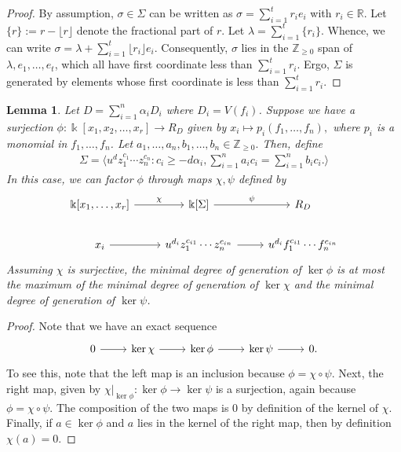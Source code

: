 \documentclass{amsart}
\theoremstyle{plain}
\newtheorem{lem}[thm]{Lemma}
\theoremstyle{definition}
\theoremstyle{remark}
\numberwithin{equation}{section}
\newcommand\br{{\mathbb R}}
\newcommand\bz{{\mathbb Z}}
\newcommand\bk{{\Bbbk}}
\newcommand\bida{a}
\newcommand\bidb{b}
\begin{document}
\begin{proof}
By assumption, $\sigma \in \Sigma$ can be written as $\sigma = \sum_{i=1}^{t} r_i e_i$ with $r_i \in \br$. Let $\{r\} := r - \lfloor r \rfloor$ denote the fractional part of $r$. Let $\lambda = \sum_{i=1}^{t}\{r_i\}$. Whence, we can write $\sigma = \lambda + \sum_{i=1}^{t}\lfloor r_i \rfloor e_i.$ Consequently, $\sigma$ lies in the $\bz_{\geq 0}$ span of $\lambda, e_1,\ldots, e_t$, which all have first coordinate less than $\sum_{i=1}^{t}r_i$. Ergo, $\Sigma$ is generated by elements whose first coordinate is less than $\sum_{i=1}^{t}r_i$.
\end{proof}


\begin{lem}
\label{lem:composite-map}
Let $D = \sum_{i=1}^{n}\alpha_i D_i$ where $D_i = V(f_i)$. Suppose we have a surjection $\phi: \bk[x_1,x_2,\ldots, x_r] \rightarrow R_D$ given by $x_i \mapsto p_i(f_1, \ldots, f_n),$ where $p_i$ is a monomial in $f_1,\ldots, f_n$. Let $\bida_1, \ldots, \bida_n, \bidb_1, \ldots, \bidb_n \in \bz_{\geq 0}.$ Then, define
\begin{align*}
	\Sigma = \langle u^d z_1^{c_1} \cdots z_n^{c_n} : c_i \geq -d \alpha_i, \sum_{i=1}^{n} \bida_i c_i = \sum_{i=1}^{n} \bidb_i c_i. \rangle 
\end{align*}
In this case, we can factor $\phi$ through maps $\chi, \psi$ defined by
\[
\begin{tikzcd}
\bk[x_1,\ldots, x_r] \ar {r}{\chi} & \bk[\Sigma] \ar {r}{\psi} & R_D \\
x_i \ar r & u^{d_i}z_1^{c_{i1}} \cdots z_n^{c_{in}} \ar r & u^{d_i}f_1^{c_{i1}} \cdots f_n^{c_{in}}
\end{tikzcd}
\]
Assuming $\chi$ is surjective, the minimal degree of generation of $\ker \phi$ is at most the maximum of the minimal degree of generation of $\ker \chi$ and the minimal degree of generation of $\ker \psi$.
\end{lem}
\begin{proof}
Note that we have an exact sequence
\[
\begin{tikzcd}
0 \ar r & \ker \chi \ar r & \ker \phi \ar r & \ker \psi \ar r & 0.
\end{tikzcd}
\]
To see this, note that the left map is an inclusion because $\phi = \chi \circ \psi$. Next, the right map, given by $\chi|_{\ker \phi}:\ker \phi \rightarrow \ker \psi$ is a surjection, again because $\phi = \chi \circ \psi$. The composition of the two maps is $0$ by definition of the kernel of $\chi$. Finally, if $a \in \ker \phi$ and $a$ lies in the kernel of the right map, then by definition $\chi(a) = 0$.
\end{proof}
\end{document}
